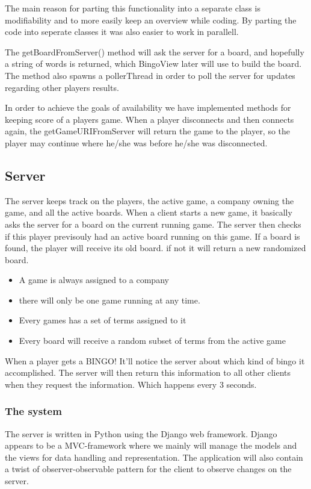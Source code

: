 The main reason for parting this functionality into a separate class is modifiability and to more easily keep an overview while coding. By parting the code into seperate classes it was also easier to work in parallell. 

The getBoardFromServer() method will ask the server for a board, and hopefully a string of words is returned, which BingoView later will use to build the board. The method also spawns a pollerThread in order to poll the server for updates regarding other players results.

In order to achieve the goals of availability we have implemented methods for keeping score of a players game. When a player disconnects and then connects again, the getGameURIFromServer will return the game to the player, so the player may continue where he/she was before he/she was disconnected.


\subsection{Server}
The server keeps track on the players, the active game, a company owning the game, and all the active boards. When a client starts a new game, it basically asks the server for a board on the current running game. The server then checks if this player previsouly had an active board running on this game. If a board is found, the player will receive its old board. if not it will return a new randomized board.

\begin{itemize}
	\item A game is always assigned to a company
	\item there will only be one game running at any time. 
	\item Every games has a set of terms assigned to it
	\item Every board will receive a random subset of terms from the active game
\end{itemize}

When a player gets a BINGO! It'll notice the server about which kind of bingo it accomplished. The server will then return this information to all other clients when they request the information. Which happens every 3 seconds.

\subsubsection{The system}
The server is written in Python using the Django web framework. Django appears to be a MVC-framework where we mainly will manage the models and the views for data handling and representation. The application will also contain a twist of observer-observable pattern for the client to observe changes on the server.

